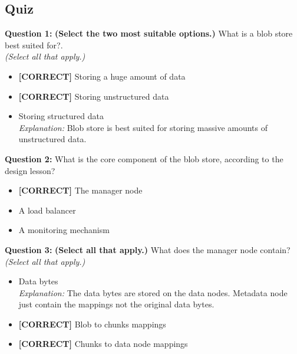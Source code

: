 

\subsection*{Quiz}
\vspace{0.3cm}
\noindent
\textbf{Question 1:} \textbf{(Select the two most suitable options.)} What is a blob store best suited for?.
\\
\textit{(Select all that apply.)}
\\[0.2cm]
\begin{itemize}
 \item \textbf{[CORRECT]} Storing a huge amount of data
 \item \textbf{[CORRECT]} Storing unstructured data
 \item Storing structured data
\\[0.1cm]
\textit{Explanation:} 
Blob store is best suited for storing massive amounts of unstructured data.
\end{itemize}
\vspace{0.3cm}
\noindent
\textbf{Question 2:} What is the core component of the blob store, according to the design lesson?
\\[0.2cm]
\begin{itemize}
 \item \textbf{[CORRECT]} The manager node
 \item A load balancer
 \item A monitoring mechanism
\end{itemize}
\vspace{0.3cm}
\noindent
\textbf{Question 3:} \textbf{(Select all that apply.)} What does the manager node contain?
\\
\textit{(Select all that apply.)}
\\[0.2cm]
\begin{itemize}
 \item Data bytes
\\[0.1cm]
\textit{Explanation:} 
The data bytes are stored on the data nodes. Metadata node just contain the mappings not the original data bytes.
 \item \textbf{[CORRECT]} Blob to chunks mappings
 \item \textbf{[CORRECT]} Chunks to data node mappings
\end{itemize}
